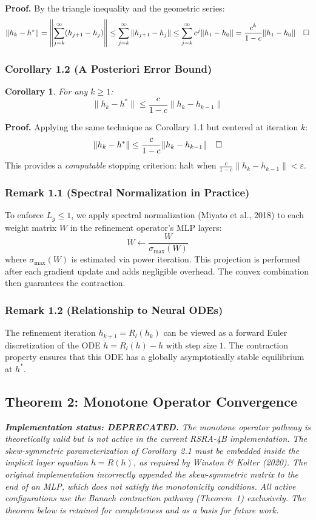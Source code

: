 \documentclass[11pt,a4paper]{article}
\newtheorem{corollary}{Corollary}[theorem]
\theoremstyle{definition}
\begin{document}
\noindent\textbf{Proof.} By the triangle inequality and the geometric series:
\[ \|h_k - h^*\| = \left\| \sum_{j=k}^{\infty} (h_{j+1} - h_j) \right\| \leq \sum_{j=k}^{\infty} \|h_{j+1} - h_j\| \leq \sum_{j=k}^{\infty} c^j \|h_1 - h_0\| = \frac{c^k}{1 - c} \|h_1 - h_0\| \quad \hfill\square \]

\subsubsection{Corollary 1.2 (A Posteriori Error Bound)}
\begin{corollary}
For any $k \geq 1$:
\[ \|h_k - h^*\| \leq \frac{c}{1 - c} \|h_k - h_{k-1}\| \]
\end{corollary}

\noindent\textbf{Proof.} Applying the same technique as Corollary 1.1 but centered at iteration $k$:
\[ \|h_k - h^*\| \leq \frac{c}{1 - c} \|h_k - h_{k-1}\| \quad \hfill\square \]
This provides a \textit{computable} stopping criterion: halt when $\frac{c}{1-c}\|h_k - h_{k-1}\| < \varepsilon$.

\subsubsection{Remark 1.1 (Spectral Normalization in Practice)}
To enforce $L_g \leq 1$, we apply spectral normalization (Miyato et al., 2018) to each weight matrix $W$ in the refinement operator's MLP layers:
\[ W \leftarrow \frac{W}{\sigma_{\max}(W)} \]
where $\sigma_{\max}(W)$ is estimated via power iteration. This projection is performed after each gradient update and adds negligible overhead. The convex combination then guarantees the contraction.

\subsubsection{Remark 1.2 (Relationship to Neural ODEs)}
The refinement iteration $h_{k+1} = R_l(h_k)$ can be viewed as a forward Euler discretization of the ODE $\dot{h} = R_l(h) - h$ with step size $1$. The contraction property ensures that this ODE has a globally asymptotically stable equilibrium at $h^*$.

\subsection{Theorem 2: Monotone Operator Convergence}

\noindent\textit{\textbf{Implementation status: DEPRECATED.} The monotone operator pathway is theoretically valid but is not active in the current RSRA-4B implementation. The skew-symmetric parameterization of Corollary~2.1 must be embedded inside the implicit layer equation $h = R(h)$, as required by Winston \& Kolter (2020). The original implementation incorrectly appended the skew-symmetric matrix to the end of an MLP, which does not satisfy the monotonicity conditions. All active configurations use the Banach contraction pathway (Theorem~1) exclusively. The theorem below is retained for completeness and as a basis for future work.}
\end{document}
